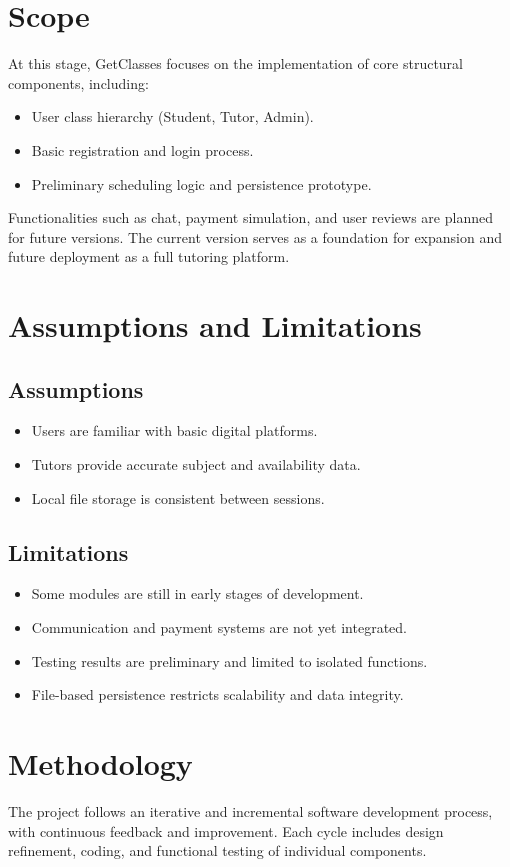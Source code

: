 \documentclass[12pt,a4paper]{report}
\begin{document}
\chapter{Scope}
At this stage, GetClasses focuses on the implementation of core structural components, including:
\begin{itemize}
    \item User class hierarchy (Student, Tutor, Admin).
    \item Basic registration and login process.
    \item Preliminary scheduling logic and persistence prototype.
\end{itemize}


Functionalities such as chat, payment simulation, and user reviews are planned for future versions. The current version serves as a foundation for expansion and future deployment as a full tutoring platform.

\chapter{Assumptions and Limitations}
\section{Assumptions}
\begin{itemize}
    \item Users are familiar with basic digital platforms.
    \item Tutors provide accurate subject and availability data.
    \item Local file storage is consistent between sessions.
\end{itemize}


\section{Limitations}
\begin{itemize}
    \item Some modules are still in early stages of development.
    \item Communication and payment systems are not yet integrated.
    \item Testing results are preliminary and limited to isolated functions.
    \item File-based persistence restricts scalability and data integrity.
\end{itemize}


\chapter{Methodology}
The project follows an iterative and incremental software development process, with continuous feedback and improvement. Each cycle includes design refinement, coding, and functional testing of individual components.
\end{document}
